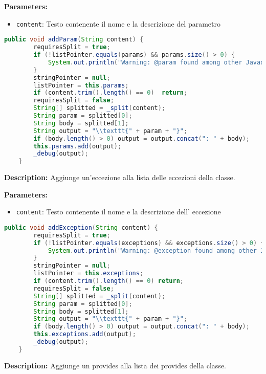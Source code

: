 \textbf{Parameters:}
\begin{itemize}
  \item\texttt{content}: Testo contenente il nome e la descrizione del parametro  
\end{itemize}

\begin{lstlisting}[language=Java]
    public void addParam(String content) {
        requiresSplit = true;
        if (!listPointer.equals(params) && params.size() > 0) {
            System.out.println("Warning: @param found among other Javadoc keywords. You should put all paramaters together.");
        }
        stringPointer = null;
        listPointer = this.params;
        if (content.trim().length() == 0)  return;
        requiresSplit = false;
        String[] splitted = _split(content);
        String param = splitted[0];
        String body = splitted[1];
        String output = "\\texttt{" + param + "}";
        if (body.length() > 0) output = output.concat(": " + body);
        this.params.add(output);
        _debug(output);
    }
\end{lstlisting}
\vspace{0.5cm}
\textbf{Description:}  Aggiunge un'eccezione alla lista delle eccezioni della classe. 

\textbf{Parameters:}
\begin{itemize}
  \item\texttt{content}: Testo contenente il nome e la descrizione dell' eccezione  
\end{itemize}

\begin{lstlisting}[language=Java]
    public void addException(String content) {
        requiresSplit = true;
        if (!listPointer.equals(exceptions) && exceptions.size() > 0) {
            System.out.println("Warning: @exception found among other Javadoc keywords. You should put all exceptions together.");
        }
        stringPointer = null;
        listPointer = this.exceptions;
        if (content.trim().length() == 0) return;
        requiresSplit = false;
        String[] splitted = _split(content);
        String param = splitted[0];
        String body = splitted[1];
        String output = "\\texttt{" + param + "}";
        if (body.length() > 0) output = output.concat(": " + body);
        this.exceptions.add(output);
        _debug(output);
    }
\end{lstlisting}
\vspace{0.5cm}
\textbf{Description:}  Aggiunge un provides alla lista dei provides della classe. 

